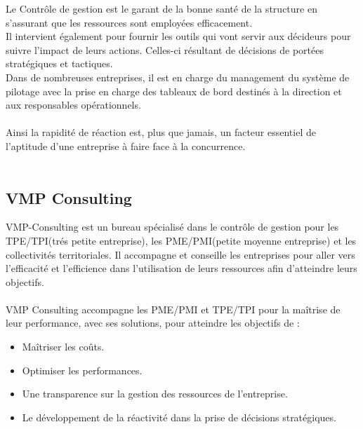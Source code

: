 \documentclass[12pt]{article}
\begin{document}
Le Contrôle de gestion est le garant de la bonne santé de la structure en s'assurant que les ressources sont employées efficacement.\\ 
Il intervient également pour fournir les outils qui vont servir aux décideurs pour suivre l'impact de leurs actions. Celles-ci résultant de décisions de portées stratégiques et tactiques.\\

Dans de nombreuses entreprises, il est en charge du management du système de pilotage avec la prise en charge des tableaux de bord destinés à la direction et aux responsables opérationnels.\\ \\

Ainsi la rapidité de réaction est, plus que jamais, un facteur essentiel de l’aptitude 
d’une  entreprise  à faire  face  à la  concurrence.\\ \\

 


\subsection{VMP Consulting}


VMP-Consulting est un bureau spécialisé dans le contrôle de gestion pour les TPE/TPI(trés petite entreprise), les PME/PMI(petite moyenne entreprise) et les collectivités territoriales. Il  accompagne et  conseille  les entreprises pour aller vers l'efficacité et l'efficience dans l'utilisation de leurs ressources afin d'atteindre leurs objectifs.\\ \\


VMP Consulting accompagne les PME/PMI et TPE/TPI pour la maîtrise de leur performance, avec ses solutions, pour atteindre les objectifs de :
\begin{itemize}

\item Maîtriser les coûts.

\item Optimiser les performances.

\item Une transparence sur la gestion des ressources de  l'entreprise.

\item Le développement de la réactivité dans la prise de décisions stratégiques.
\end{itemize}
\\ \\ 
\end{document}
